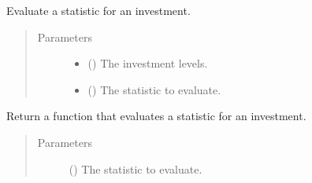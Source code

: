 \documentclass[letterpaper,10pt,english]{sphinxmanual}
\begin{document}
\begin{fulllineitems}
\begin{fulllineitems}
\begin{quote}
\begin{description}
\end{description}\end{quote}

\end{fulllineitems}


\begin{fulllineitems}
\label{\detokenize{tyche:tyche.Evaluator.Evaluator.evaluate_statistic}}
Evaluate a statistic for an investment.
\begin{quote}\begin{description}
\item[{Parameters}] \leavevmode\begin{itemize}
\item {} 
 () \textendash{} The investment levels.

\item {} 
 () \textendash{} The statistic to evaluate.

\end{itemize}

\end{description}\end{quote}

\end{fulllineitems}


\begin{fulllineitems}
\label{\detokenize{tyche:tyche.Evaluator.Evaluator.make_statistic_evaluator}}
Return a function that evaluates a statistic for an investment.
\begin{quote}\begin{description}
\item[{Parameters}] \leavevmode
{} () \textendash{} The statistic to evaluate.

\end{description}\end{quote}

\end{fulllineitems}


\end{fulllineitems}
\end{document}
